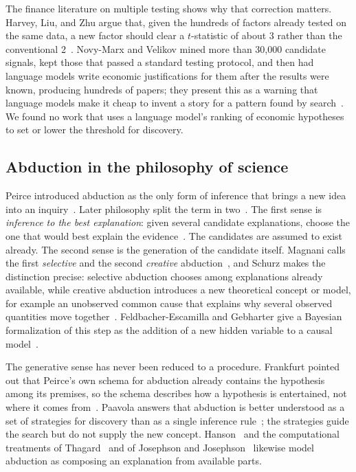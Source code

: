 \documentclass[11pt]{article}
\begin{document}
The finance literature on multiple testing shows why that correction matters. Harvey, Liu, and Zhu argue
that, given the hundreds of factors already tested on the same data, a new factor should clear a
$t$-statistic of about 3 rather than the conventional 2~\cite{harvey}. Novy-Marx and Velikov mined more
than 30{,}000 candidate signals, kept those that passed a standard testing protocol, and then had language
models write economic justifications for them after the results were known, producing hundreds of
papers; they present this as a warning that language models make it cheap to invent a story for a
pattern found by search~\cite{novymarx}. We found no work that uses a language model's ranking of
economic hypotheses to set or lower the threshold for discovery.

\subsection{Abduction in the philosophy of science}

Peirce introduced abduction as the only form of inference that brings a new idea into an
inquiry~\cite{peirce}. Later philosophy split the term in two~\cite{douven}. The first sense is
\emph{inference to the best explanation}: given several candidate explanations, choose the one that
would best explain the evidence~\cite{harman,lipton}. The candidates are assumed to exist already. The
second sense is the generation of the candidate itself. Magnani calls the first \emph{selective} and
the second \emph{creative} abduction~\cite{magnani2001}, and Schurz makes the distinction precise:
selective abduction chooses among explanations already available, while creative abduction introduces a
new theoretical concept or model, for example an unobserved common cause that explains why several
observed quantities move together~\cite{schurz,schurz2016}. Feldbacher-Escamilla and Gebharter give a
Bayesian formalization of this step as the addition of a new hidden variable to a causal
model~\cite{feldbacher}.

The generative sense has never been reduced to a procedure. Frankfurt pointed out that Peirce's own
schema for abduction already contains the hypothesis among its premises, so the schema describes how a
hypothesis is entertained, not where it comes from~\cite{frankfurt}. Paavola answers that abduction is
better understood as a set of strategies for discovery than as a single inference rule~\cite{paavola};
the strategies guide the search but do not supply the new concept. Hanson~\cite{hanson} and the
computational treatments of Thagard~\cite{thagard1988} and of Josephson and
Josephson~\cite{josephson} likewise model abduction as composing an explanation from available parts.
\end{document}
